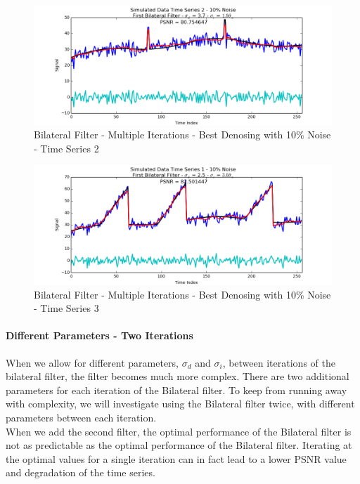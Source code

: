 \documentclass[11pt]{article}
\theoremstyle{definition}
\begin{document}
\begin{figure}
\centering
\includegraphics[width = 0.75 \textwidth]{ItrSameBilateralSignal2Best.png}
\caption{Bilateral Filter - Multiple Iterations - Best Denosing with 10\% Noise - Time Series 2}
\label{itrsamebilateral2best}
\end{figure}

\begin{figure}
\centering
\includegraphics[width = 0.75 \textwidth]{ItrSameBilateralSignal3Best.png}
\caption{Bilateral Filter - Multiple Iterations - Best Denosing with 10\% Noise - Time Series 3}
\label{itrsamebilateral3best}
\end{figure}

\newpage

\paragraph{Different Parameters - Two Iterations}

When we allow for different parameters, $\sigma_d$ and $\sigma_i$, between iterations of the bilateral filter, the filter becomes much more complex. There are two additional parameters for each iteration of the Bilateral filter. To keep from running away with complexity, we will investigate using the Bilateral filter twice, with different parameters between each iteration.\\

When we add the second filter, the optimal performance of the Bilateral filter is not as predictable as the optimal performance of the Bilateral filter. Iterating at the optimal values for a single iteration can in fact lead to a lower PSNR value and degradation of the time series.
\end{document}
